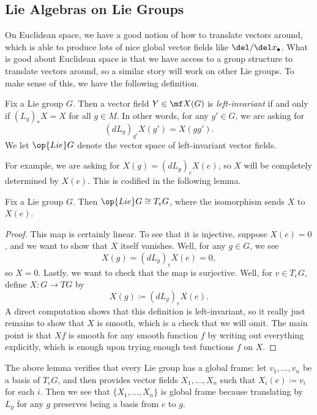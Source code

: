 \documentclass[../notes.tex]{subfiles}
\begin{document}
\subsection{Lie Algebras on Lie Groups}
On Euclidean space, we have a good notion of how to translate vectors around, which is able to produce lots of nice global vector fields like $\del/\del x_\bullet$. What is good about Euclidean space is that we have access to a group structure to translate vectors around, so a similar story will work on other Lie groups. To make sense of this, we have the following definition.
\begin{definition}[invariant]
	Fix a Lie group $G$. Then a vector field $Y\in\mf X(G)$ is \textit{left-invariant} if and only if $(L_g)_*X=X$ for all $g\in M$. In other words, for any $g'\in G$, we are asking for
	\[(dL_g)_{g'}X(g')=X(gg').\]
	We let $\op{Lie}G$ denote the vector space of left-invariant vector fields.
\end{definition}
For example, we are asking for $X(g)=(dL_g)_eX(e)$, so $X$ will be completely determined by $X(e)$. This is codified in the following lemma.
\begin{lemma} \label{lem:lie-is-tangent-space}
	Fix a Lie group $G$. Then $\op{Lie}G\cong T_eG$, where the isomorphism sends $X$ to $X(e)$.
\end{lemma}
\begin{proof}
	This map is certainly linear. To see that it is injective, suppose $X(e)=0$, and we want to show that $X$ itself vanishes. Well, for any $g\in G$, we see
	\[X(g)=(dL_g)_eX(e)=0,\]
	so $X=0$. Lastly, we want to check that the map is surjective. Well, for $v\in T_eG$, define $X\colon G\to TG$ by
	\[X(g)\coloneqq(dL_g)_eX(e).\]
	A direct computation shows that this definition is left-invariant, so it really just remains to show that $X$ is smooth, which is a check that we will omit. The main point is that $Xf$ is smooth for any smooth function $f$ by writing out everything explicitly, which is enough upon trying enough test functions $f$ on $X$.
\end{proof}
\begin{remark}
	The above lemma verifies that every Lie group has a global frame: let $v_1,\ldots,v_n$ be a basis of $T_eG$, and then  provides vector fields $X_1,\ldots,X_n$ such that $X_i(e)\coloneqq v_i$ for each $i$. Then we see that $\{X_1,\ldots,X_n\}$ is global frame because translating by $L_g$ for any $g$ preserves being a basis from $e$ to $g$.
\end{remark}
\end{document}
